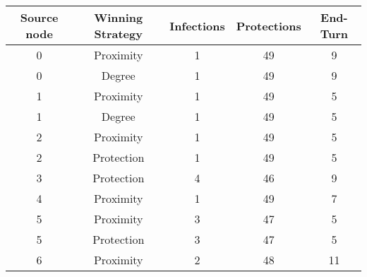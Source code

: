 \documentclass[results.tex]{subfiles}
\begin{document}
    \begin{center}
        \begin{tabular}{| c || c | c | c | c |}
            \hline
            {\bfseries Source node} & {\bfseries Winning Strategy} & {\bfseries Infections} & {\bfseries Protections}
            & {\bfseries End-Turn}
            \\  %
            \hline\hline
            0                       & Proximity                    & 1                      & 49                      & 9                    \\
            \hline
            0                       & Degree                       & 1                      & 49                      & 9                    \\
            \hline
            1                       & Proximity                    & 1                      & 49                      & 5                    \\
            \hline
            1                       & Degree                       & 1                      & 49                      & 5                    \\
            \hline
            2                       & Proximity                    & 1                      & 49                      & 5                    \\
            \hline
            2                       & Protection                   & 1                      & 49                      & 5                    \\
            \hline
            3                       & Protection                   & 4                      & 46                      & 9                    \\
            \hline
            4                       & Proximity                    & 1                      & 49                      & 7                    \\
            \hline
            5                       & Proximity                    & 3                      & 47                      & 5                    \\
            \hline
            5                       & Protection                   & 3                      & 47                      & 5                    \\
            \hline
            6                       & Proximity                    & 2                      & 48                      & 11                   \\

\end{tabular}
\end{center}
\end{document}
